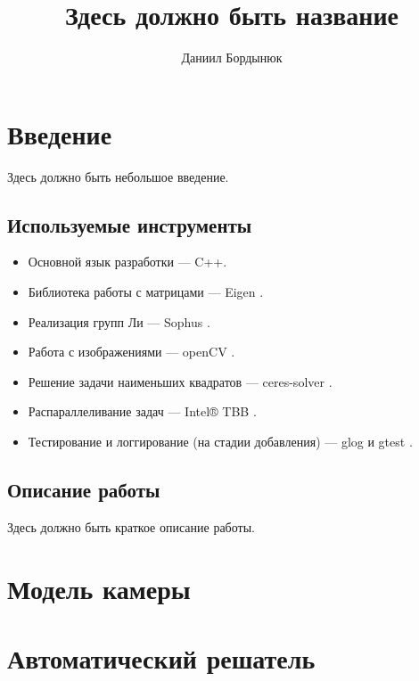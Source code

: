


\title{Здесь должно быть название}
\author{Даниил Бордынюк}


\maketitle

\tableofcontents
\clearpage

\chapter*{Введение}
Здесь должно быть небольшое введение.

\section{Используемые инструменты}
\begin{itemize}
	\item Основной язык разработки --- C++.
	\item Библиотека работы с матрицами --- Eigen \cite{eigen}. 
	\item Реализация групп Ли --- Sophus \cite{sophus}.
	\item Работа с изображениями --- openCV \cite{opencv_library}.
	\item Решение задачи наименьших квадратов --- ceres-solver \cite{ceres-solver}.
	\item Распараллеливание задач --- Intel® TBB \cite{tbb}.
	\item Тестирование и логгирование (на стадии добавления) --- glog \cite{glog} и gtest \cite{gtest}.
\end{itemize}

\section{Описание работы}
Здесь должно быть краткое описание работы.
	
\chapter{Модель камеры}


\chapter{Автоматический решатель}


